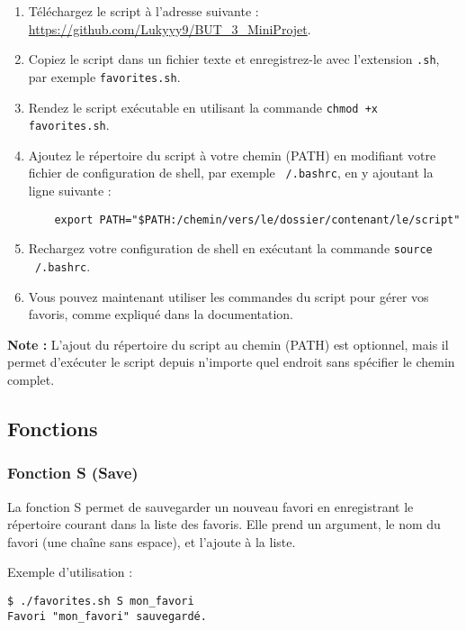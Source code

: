 \documentclass[a4paper, 12pt]{article}
\begin{document}
\begin{enumerate}
    \item Téléchargez le script à l'adresse suivante : \url{https://github.com/Lukyyy9/BUT_3_MiniProjet}.
    \item Copiez le script dans un fichier texte et enregistrez-le avec l'extension \texttt{.sh}, par exemple \texttt{favorites.sh}.

    \item Rendez le script exécutable en utilisant la commande \texttt{chmod +x favorites.sh}.

    \item Ajoutez le répertoire du script à votre chemin (PATH) en modifiant votre fichier de configuration de shell, par exemple \texttt{~/.bashrc}, en y ajoutant la ligne suivante :

    \begin{verbatim}
    export PATH="$PATH:/chemin/vers/le/dossier/contenant/le/script"
    \end{verbatim}

    \item Rechargez votre configuration de shell en exécutant la commande \texttt{source ~/.bashrc}.

    \item Vous pouvez maintenant utiliser les commandes du script pour gérer vos favoris, comme expliqué dans la documentation.

\end{enumerate}

\textbf{Note :} L'ajout du répertoire du script au chemin (PATH) est optionnel, mais il permet d'exécuter le script depuis n'importe quel endroit sans spécifier le chemin complet.

\subsection{Fonctions}
\subsubsection{Fonction S (Save)}
La fonction S permet de sauvegarder un nouveau favori en enregistrant le répertoire courant dans la liste des favoris. Elle prend un argument, le nom du favori (une chaîne sans espace), et l'ajoute à la liste.

Exemple d'utilisation :
\begin{lstlisting}[style=mystyle]
$ ./favorites.sh S mon_favori
Favori "mon_favori" sauvegardé.
\end{lstlisting}
\end{document}
